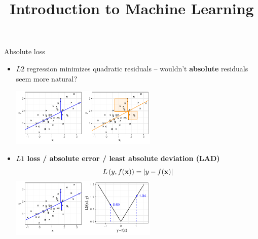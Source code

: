 \documentclass[11pt,compress,t,notes=noshow, xcolor=table]{beamer}
\title{Introduction to Machine Learning}
\institute{\href{https://compstat-lmu.github.io/lecture_i2ml/}{compstat-lmu.github.io/lecture\_i2ml}}
\date{}
\begin{document}


\begin{vbframe}{Absolute loss}

\begin{itemize}
    \item $L2$ regression minimizes quadratic residuals -- wouldn't 
    \textbf{absolute} residuals seem more natural? 
    
    \vspace{0.2cm}
    \includegraphics[width=0.55\textwidth]{figure/reg_l1_residual_abs_vs_quad}
    \item \textbf{$L1$ loss / absolute error / least absolute deviation (LAD)}
    $$L\left(y, f(\mathbf{x})\right) = |y - f(\mathbf{x})|$$
    \includegraphics[width=0.55\textwidth]{figure/reg_l1_lossplot_abs} 
\end{itemize}

\end{vbframe}

\end{document}
